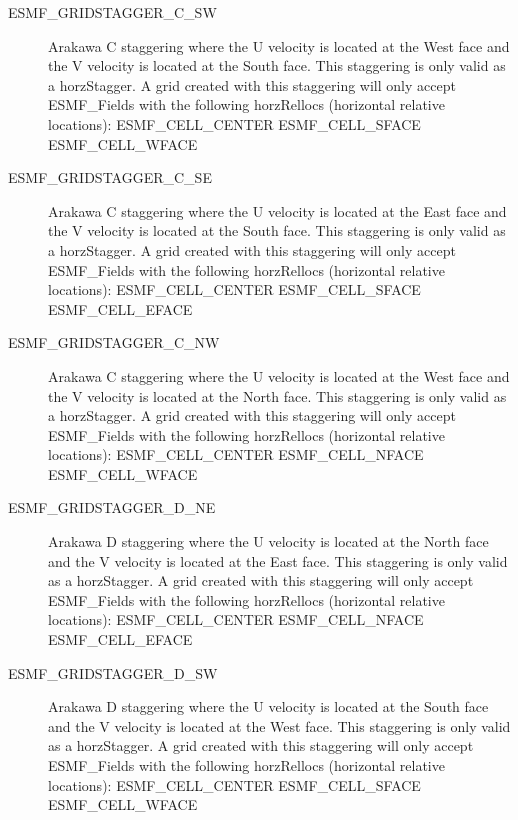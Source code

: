 \begin{description}
   \item [ESMF\_GRIDSTAGGER\_C\_SW]
         Arakawa C staggering where the U velocity is located at the West face
         and the V velocity is located at the South face.  This staggering is
         only valid as a horzStagger.  A grid created with this staggering will
         only accept ESMF\_Fields with the following horzRellocs (horizontal
         relative locations):
             ESMF\_CELL\_CENTER
             ESMF\_CELL\_SFACE
             ESMF\_CELL\_WFACE

   \item [ESMF\_GRIDSTAGGER\_C\_SE]
         Arakawa C staggering where the U velocity is located at the East face
         and the V velocity is located at the South face.  This staggering is
         only valid as a horzStagger.  A grid created with this staggering will
         only accept ESMF\_Fields with the following horzRellocs (horizontal
         relative locations):
             ESMF\_CELL\_CENTER
             ESMF\_CELL\_SFACE
             ESMF\_CELL\_EFACE

   \item [ESMF\_GRIDSTAGGER\_C\_NW]
         Arakawa C staggering where the U velocity is located at the West face
         and the V velocity is located at the North face.  This staggering is
         only valid as a horzStagger.  A grid created with this staggering will
         only accept ESMF\_Fields with the following horzRellocs (horizontal
         relative locations):
             ESMF\_CELL\_CENTER
             ESMF\_CELL\_NFACE
             ESMF\_CELL\_WFACE

   \item [ESMF\_GRIDSTAGGER\_D\_NE]
         Arakawa D staggering where the U velocity is located at the North face
         and the V velocity is located at the East face.  This staggering is
         only valid as a horzStagger.  A grid created with this staggering will 
         only accept ESMF\_Fields with the following horzRellocs (horizontal
         relative locations):
             ESMF\_CELL\_CENTER
             ESMF\_CELL\_NFACE
             ESMF\_CELL\_EFACE

   \item [ESMF\_GRIDSTAGGER\_D\_SW]
         Arakawa D staggering where the U velocity is located at the South face
         and the V velocity is located at the West face.  This staggering is
         only valid as a horzStagger.  A grid created with this staggering will
         only accept ESMF\_Fields with the following horzRellocs (horizontal
         relative locations):
             ESMF\_CELL\_CENTER
             ESMF\_CELL\_SFACE
             ESMF\_CELL\_WFACE


\end{description}
